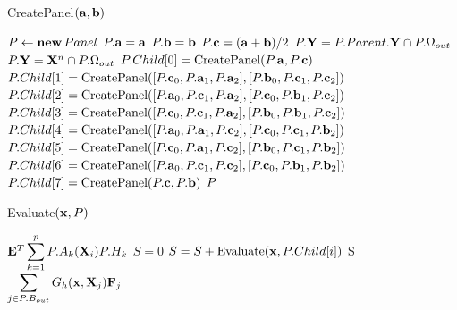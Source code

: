\begin{algorithm}
\caption{CreatePanel$(\mathbf{a}, \mathbf{b})$}
\label{func:Create}
\begin{algorithmic}
\STATE $P \gets \mathbf{new} \, Panel$
\STATE $P.\mathbf{a} = \mathbf{a}$
\STATE $P.\mathbf{b} = \mathbf{b}$
\STATE $P.\mathbf{c} = (\mathbf{a} + \mathbf{b}) / 2$
	\STATE $P.\mathbf{Y} = P.Parent.\mathbf{Y} \cap P.\Omega_{out}$
\ELSE
	\STATE $P.\mathbf{Y} = \mathbf{X}^n \cap P.\Omega_{out}$
\ENDIF
{}
	\STATE $ P.Child[0] = \text{CreatePanel}(
	P.\mathbf{a},
	P.\mathbf{c})$
	\STATE $ P.Child[1] = \text{CreatePanel}(
	[P.\mathbf{c}_0, P.\mathbf{a}_1, P.\mathbf{a}_2] ,
	[P.\mathbf{b}_0, P.\mathbf{c}_1, P.\mathbf{c}_2] )$
	\STATE $ P.Child[2] = \text{CreatePanel}(
	[P.\mathbf{a}_0, P.\mathbf{c}_1, P.\mathbf{a}_2] ,
	[P.\mathbf{c}_0, P.\mathbf{b}_1, P.\mathbf{c}_2] )$
	\STATE $ P.Child[3] = \text{CreatePanel}(
	[P.\mathbf{c}_0, P.\mathbf{c}_1, P.\mathbf{a}_2] ,
	[P.\mathbf{b}_0, P.\mathbf{b}_1, P.\mathbf{c}_2] )$
	\STATE $ P.Child[4] = \text{CreatePanel}(
	[P.\mathbf{a}_0, P.\mathbf{a}_1, P.\mathbf{c}_2] ,
	[P.\mathbf{c}_0, P.\mathbf{c}_1, P.\mathbf{b}_2] )$
	\STATE $ P.Child[5] = \text{CreatePanel}(
	[P.\mathbf{c}_0, P.\mathbf{a}_1, P.\mathbf{c}_2] ,
	[P.\mathbf{b}_0, P.\mathbf{c}_1, P.\mathbf{b}_2] )$
	\STATE $ P.Child[6] = \text{CreatePanel}(
	[P.\mathbf{a}_0, P.\mathbf{c}_1, P.\mathbf{c}_2] ,
	[P.\mathbf{c}_0, P.\mathbf{b}_1, P.\mathbf{b}_2] )$
	\STATE $ P.Child[7] = \text{CreatePanel}(
	P.\mathbf{c},
	P.\mathbf{b})$
\ENDIF
\RETURN $P$
\end{algorithmic}
\end{algorithm}

\begin{algorithm}
\caption{Evaluate$(\mathbf{x}, P)$}
\label{func:Eval}
\begin{algorithmic}
	\RETURN $\mathbf{E}^T \displaystyle\sum_{k=1}^{p}P.A_k(\mathbf{X}_i)P.H_k$
\ELSE
		\STATE $S = 0$ 
			\STATE $S = S + \text{Evaluate}(\mathbf{x}, P.Child[i])$
		\ENDFOR
		\RETURN S
		\RETURN $\displaystyle\sum_{j\in P.B_{out}} G_h(\mathbf{x}, \mathbf{X}_j) \mathbf{F}_j$
	\ENDIF
\ENDIF
\end{algorithmic}
\end{algorithm}

